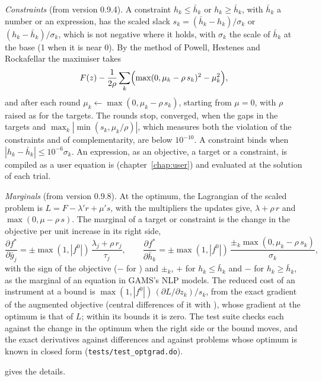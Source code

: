\textit{Constraints} (from version 0.9.4). A constraint $h_k \le \bar h_k$ or
$h_k \ge \bar h_k$, with $\bar h_k$ a number or an expression, has the scaled
slack $s_k = (\bar h_k - h_k)/\sigma_k$ or $(h_k - \bar h_k)/\sigma_k$, which is
not negative where it holds, with $\sigma_k$ the scale of $\bar h_k$ at the base
(1 when it is near 0). By the method of Powell, Hestenes and Rockafellar the
maximiser takes
\begin{equation*}
F(z) - \frac{1}{2\rho} \sum_k \Bigl(\max(0, \mu_k - \rho\, s_k)^2 - \mu_k^2\Bigr),
\end{equation*}
and after each round $\mu_k \leftarrow \max(0, \mu_k - \rho\, s_k)$, starting
from $\mu = 0$, with $\rho$ raised as for the targets. The rounds stop,
converged, when the gaps in the targets and $\max_k |\min(s_k, \mu_k/\rho)|$,
which measures both the violation of the constraints and of complementarity,
are below $10^{-10}$. A constraint binds when $|h_k - \bar h_k| \le 10^{-6}
\sigma_k$. An expression, as an objective, a target or a constraint, is
compiled as a user equation is (chapter~\ref{chap:user}) and evaluated at the
solution of each trial.

\textit{Marginals} (from version 0.9.8). At the optimum, the Lagrangian of the
scaled problem is $L = F - \lambda' r + \mu' s$, with the multipliers the
updates give, $\lambda + \rho\, r$ and $\max(0, \mu - \rho\, s)$. The marginal of
a target or constraint is the change in the objective per unit increase in its
right side,
\begin{equation*}
\frac{\partial f^*}{\partial \bar g_j} = \pm \max(1, |f^0|)\, \frac{\lambda_j + \rho\, r_j}{\tau_j}, \qquad
\frac{\partial f^*}{\partial \bar h_k} = \pm \max(1, |f^0|)\, \frac{\pm_k \max(0, \mu_k - \rho\, s_k)}{\sigma_k},
\end{equation*}
with the sign of the objective ($-$ for ) and $\pm_k$, $+$ for
$h_k \le \bar h_k$ and $-$ for $h_k \ge \bar h_k$, as the marginal of an
equation in GAMS's NLP models. The reduced cost of an instrument at a bound is
$\max(1, |f^0|)\, (\partial L / \partial z_k) / s_k$, from the exact gradient
of the augmented objective (central differences of it with
), whose gradient at the optimum is that of $L$;
within its bounds it is zero. The test suite checks each against the change
in the optimum when the right side or the bound moves, and the exact
derivatives against differences and against problems whose optimum is known
in closed form (\texttt{tests/test\_optgrad.do}).

 gives the details.


\begin{alsosee}
\end{alsosee}
